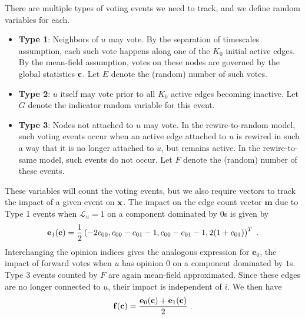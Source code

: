 \documentclass[review, onefignum, onetabnum]{siamart171218}
\begin{document}
		There are multiple types of voting events we need to track, and we define random variables for each. 
		\begin{itemize}
			\item \textbf{Type 1}: Neighbors of $u$ may vote. By the separation of timescales assumption, each such vote happens along one of the $K_0$ initial active edges. By the mean-field assumption, votes on these nodes are governed by the global statistics $\mathbf{c}$. Let $E$ denote the (random) number of such votes. 
			\item \textbf{Type 2}: $u$ itself may vote prior to all $K_0$ active edges becoming inactive. Let $G$ denote the indicator random variable for this event. 
			\item \textbf{Type 3}: Nodes not attached to $u$ may vote. In the rewire-to-random model, such voting events occur when an active edge attached to $u$ is rewired in such a way that it is no longer attached to $u$, but remains active. In the rewire-to-same model, such events do not occur. Let $F$ denote the (random) number of these events. 
		\end{itemize}

		These variables will count the voting events, but we also require vectors to track the impact of a given event on $\mathbf{x}$. 
		The impact on the edge count vector $\mathbf{m}$ due to Type 1 events when $\mathcal{L}_u = 1$ on a component dominated by $0$s is given by 
		\begin{align}
			\mathbf{e}_1(\mathbf{c}) = \frac{1}{2}\left(-2c_{00} , c_{00} - c_{01} - 1, c_{00} - c_{01} - 1, 2(1+c_{01})\right)^T\;.
		\end{align}
		Interchanging the opinion indices gives the analogous expression for $\mathbf{e}_0$, the impact of forward votes when $u$ has opinion $0$ on a component dominated by $1$s. 
		Type 3 events counted by $F$ are again mean-field approximated. 
		Since these edges are no longer connected to $u$, their impact is independent of $i$. 
		We then have
		\begin{align}
			\mathbf{f}(\mathbf{c}) = \frac{\mathbf{e}_0(\mathbf{c}) + \mathbf{e}_1(\mathbf{c})}{2}\;.
		\end{align}
\end{document}

